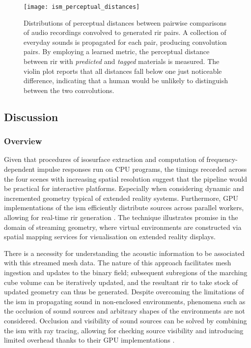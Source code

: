 \begin{figure}[htbp]
 \centering %
 \texttt{[image: ism\_perceptual\_distances]}
 \caption[Image-Source Model-based acoustic rendering --- Perceptual evaluation results]{Distributions of perceptual distances between pairwise comparisons of audio recordings convolved to generated \acrshort{rir} pairs.
A collection of everyday sounds is propagated for each pair, producing convolution pairs. By employing a learned metric, the perceptual distance between \acrshort{rir} with \emph{predicted} and \emph{tagged} materials is measured. The violin plot reports that all distances fall below one just noticeable difference, indicating that a human would be unlikely to distinguish between the two convolutions.}
 \label{fig:ism_perceptual_evaluation}
\end{figure}

\subsection{Discussion}
\subsubsection{Overview}
Given that procedures of isosurface extraction and computation of frequency-dependent impulse responses run on CPU programs, the timings recorded across the four scenes with increasing spatial resolution suggest that the pipeline would be practical for interactive platforms. Especially when considering dynamic and incremented geometry typical of extended reality systems. Furthermore, GPU implementations of the \acrshort{ism} efficiently distribute sources across parallel workers, allowing for real-time \acrshort{rir} generation \citep{diaz2021gpurir}. The technique illustrates promise in the domain of streaming geometry, where virtual environments are constructed via spatial mapping services for visualisation on extended reality displays.\par
There is a necessity for understanding the acoustic information to be associated with this streamed mesh data. The nature of this approach facilitates mesh ingestion and updates to the binary field; subsequent subregions of the marching cube volume can be iteratively updated, and the resultant \acrshort{rir} to take stock of updated geometry can thus be generated. Despite overcoming the limitations of the \acrshort{ism} in propagating sound in non-enclosed environments, phenomena such as the occlusion of sound sources and arbitrary shapes of the environments are not considered. Occlusion and visibility of sound sources can be solved by combining the \acrshort{ism} with ray tracing, allowing for checking source visibility and introducing limited overhead thanks to their GPU implementations \citep{taylor2012guided}.\par

